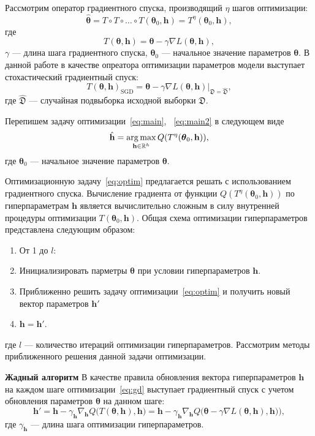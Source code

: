 Рассмотрим оператор градиентного спуска, производящий $\eta$ шагов оптимизации:
\begin{equation}
\label{eq:gd}
	 \hat{\boldsymbol{\theta}} = T \circ T \circ \dots \circ T(\boldsymbol{\theta}_0, \mathbf{h}) = T^\eta(\boldsymbol{\theta}_0, \mathbf{h}),
\end{equation}
где 
$$
	T(\boldsymbol{\theta}, \mathbf{h}) =\boldsymbol{\theta} - \gamma \nabla L(\boldsymbol{\theta}, \mathbf{h}), 
$$
$\gamma$ --- длина шага градиентного спуска, $\boldsymbol{\theta}_0$ --- начальное значение параметров $\boldsymbol{\theta}$. В данной работе в качестве опреатора оптимизации параметров модели выступает стохастический градиентный спуск:
\[
T(\boldsymbol{\theta}, \mathbf{h})_\text{SGD} =\boldsymbol{\theta} - \gamma \nabla L(\boldsymbol{\theta}, \mathbf{h})|_{\mathfrak{D} = \hat{\mathfrak{D}}},
\]
где $\hat{\mathfrak{D}}$ --- случайная подвыборка исходной выборки $\mathfrak{D}$.

Перепишем задачу оптимизации~\eqref{eq:main}, ~\eqref{eq:main2} в следующем виде
\begin{equation}
\label{eq:optim}
	\hat{\mathbf{h}} = \operatorname*{arg\,max}_{\mathbf{h} \in \mathbb{R}^h} Q( T^\eta(\boldsymbol{\theta}_0, \mathbf{h})),
\end{equation}
где $\boldsymbol{\theta}_0$ --- начальное значение параметров $\boldsymbol{\theta}$.

Оптимизационную задачу~\eqref{eq:optim} предлагается решать с использованием градиентного спуска. Вычисление градиента от функции $Q( T^\eta(\boldsymbol{\theta}_0, \mathbf{h}))$ по гиперпараметрам $\mathbf{h}$ является вычислительно сложным в силу внутренней процедуры оптимизации $T(\boldsymbol{\theta}_0, \mathbf{h})$. 
Общая схема  оптимизации гиперпараметров представлена следующим образом:
\begin{enumerate}
\item От 1 до  $l$:
\item Инициализировать парметры $\boldsymbol{\theta}$ при условии гиперпараметров $\mathbf{h}$.
\item Приближенно решить задачу оптимизации~\eqref{eq:optim} и получить новый вектор параметров $\mathbf{h}'$
\item $\mathbf{h} = \mathbf{h}'$.
\end{enumerate}
где $l$ --- количество итераций оптимизации гиперпараметров. Рассмотрим методы приближенного решения данной задачи оптимизации.



\textbf{Жадный алгоритм}
В качестве  правила обновления вектора гиперпараметров $\mathbf{h}$ на каждом шаге оптимизации~\eqref{eq:gd} выступает градиентный спуск с учетом обновления параметров $\boldsymbol{\theta}$ на данном шаге:
\[
	\mathbf{h}' = \mathbf{h} - \gamma_{\mathbf{h}} \nabla_{\mathbf{h}}  Q \bigl(T(\boldsymbol{\theta}, \mathbf{h}) , \mathbf{h}\bigr) = \mathbf{h} - \gamma_{\mathbf{h}} \nabla_{\mathbf{h}}  Q\bigl(\boldsymbol{\theta} - \gamma \nabla L(\boldsymbol{\theta}, \mathbf{h}), \mathbf{h})\bigr),
\]
где $\gamma_{\mathbf{h}}$ --- длина шага оптимизации гиперпараметров.

